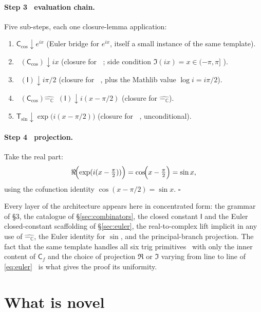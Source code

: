 \documentclass[11pt]{article}
\newcommand{\hexpC}{\mathop{\widehat{\exp_{\!\mathbb{C}}}}}
\newcommand{\hlogC}{\mathop{\widehat{\log_{\!\mathbb{C}}}}}
\newcommand{\hsubC}{\mathbin{\widehat{-_{\!\mathbb{C}}}}}
\theoremstyle{plain}
\theoremstyle{definition}
\begin{document}
\paragraph{Step 3 \textemdash\ evaluation chain.} Five sub-steps, each
one closure-lemma application:
\begin{enumerate}[label=(\roman*), topsep=2pt, itemsep=2pt]
  \item $\mathsf{C}_{\cos} \downarrow e^{ix}$ \quad (Euler bridge for
    $e^{ix}$, itself a small instance of the same template).
  \item $\hlogC(\mathsf{C}_{\cos}) \downarrow ix$ \quad (closure for
    $\hlogC$; side condition $\Im(ix) = x \in (-\pi, \pi]$ \checkmark).
  \item $\hlogC(\mathsf{I}) \downarrow i\pi/2$ \quad (closure for
    $\hlogC$, plus the Mathlib value $\log i = i\pi/2$).
  \item $\hlogC(\mathsf{C}_{\cos}) \hsubC \hlogC(\mathsf{I})
    \downarrow i(x - \pi/2)$ \quad (closure for $\hsubC$).
  \item $\mathsf{T}_{\sin} \downarrow \exp\!\bigl(i(x - \pi/2)\bigr)$
    \quad (closure for $\hexpC$, unconditional).
\end{enumerate}

\paragraph{Step 4 \textemdash\ projection.} Take the real part:
\[
  \Re\!\Bigl(\exp(i(x - \tfrac{\pi}{2}))\Bigr)
   = \cos\!\Bigl(x - \tfrac{\pi}{2}\Bigr)
   = \sin x,
\]
using the cofunction identity $\cos(x - \pi/2) = \sin x$. \(\square\)

\medskip

Every layer of the architecture appears here in concentrated form:
the grammar of \S3, the catalogue of \S\ref{sec:combinators}, the
closed constant $\mathsf{I}$ and the Euler closed-constant scaffolding
of \S\ref{sec:euler}, the real-to-complex lift implicit in any use of
$\hsubC$, the Euler identity for $\sin$, and the principal-branch
projection. The fact that the same template handles all six trig
primitives \textemdash\ with only the inner content of $\mathsf{C}_f$ and
the choice of projection $\Re$ or $\Im$ varying from line to line of
\eqref{eq:euler} \textemdash\ is what gives the proof its uniformity.

\section{What is novel}
\end{document}
